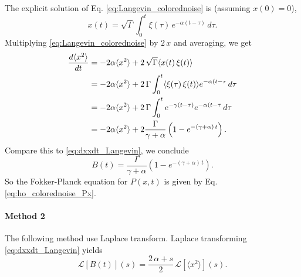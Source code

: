 \documentclass{article}
\begin{document}
The explicit solution of Eq. \eqref{eq:Langevin_colorednoise} is
(assuming $x(0) = 0$),
%
\begin{equation}
  x(t) = \sqrt{\Gamma} \int_0^t \xi(\tau) \, e^{-\alpha(t-\tau)}  \, d\tau.
\label{eq:xt_solution}
\end{equation}
%
Multiplying \eqref{eq:Langevin_colorednoise} by $2 \, x$ and averaging, we get
%
\begin{align}
  \frac{ d \langle x^2 \rangle } { d t }
  &=
  -2\alpha \langle x^2 \rangle
  + 2 \, \sqrt\Gamma
  \langle x(t) \, \xi(t) \rangle
  \notag
  \\
  &=
  -2\alpha \langle x^2 \rangle
  + 2 \, \Gamma
  \int_0^t \langle \xi(\tau) \, \xi(t) \rangle e^{-\alpha(t- \tau} \, d\tau
  \notag
  \\
  &=
  -2\alpha \langle x^2 \rangle
  + 2 \, \Gamma
  \int_0^t e^{-\gamma(t - \tau)} e^{-\alpha(t - \tau} \, d\tau
  \notag
  \\
  &=
  -2\alpha \langle x^2 \rangle
  + 2 \frac{ \Gamma } { \gamma + \alpha }
  \left(
    1 - e^{-(\gamma + \alpha) \, t}
  \right).
\end{align}
%
Compare this to \eqref{eq:dxxdt_Langevin},
we conclude
\begin{equation}
B(t) =
  \frac{ \Gamma } { \gamma + \alpha }
  \left(
    1 - e^{-(\gamma + \alpha) \, t}
  \right).
  \label{eq:Bt_colorednoise}
\end{equation}
So the Fokker-Planck equation for $P(x, t)$ is given by
Eq. \eqref{eq:ho_colorednoise_Px}.



\paragraph{Method 2}

The following method use Laplace transform.
%
Laplace transforming \eqref{eq:dxxdt_Langevin} yields
\begin{equation}
\mathcal L[ B(t) ](s) = \frac{2 \, \alpha + s}{2} \, \mathcal L[\langle x^2 \rangle](s).
\label{eq:Laplace_B_xx}
\end{equation}
\end{document}
